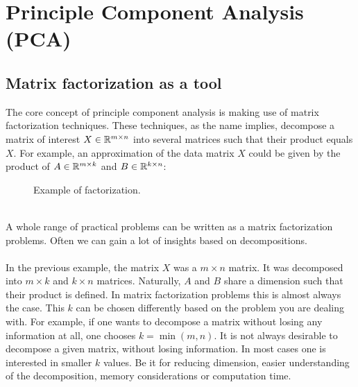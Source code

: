 \renewcommand{\this}{PCA}

\chapter{Principle Component Analysis (PCA)}
	\section{Matrix factorization as a tool}
		The core concept of principle component analysis is making use of matrix factorization techniques. These techniques, as the name implies, decompose a matrix of interest $X \in \mathbb{R}^{m \times n}$ into several matrices such that their product equals $X$. For example, an approximation of the data matrix $X$ could be given by the product of $A \in \mathbb{R}^{m \times k}$ and $B \in \mathbb{R}^{k \times n}$:\\
		\begin{figure}[h!]
			\centering	
			\label{approx}
			\caption{Example of factorization.}
		\end{figure}\\
		A whole range of practical problems can be written as a matrix factorization problems. Often we can gain a lot of insights based on decompositions.
\\\\
In the previous example, the matrix $X$ was a $m \times n$ matrix. It was decomposed into $m \times k$ and $k \times n$ matrices. Naturally, $A$ and $B$ share a dimension such that their product is defined. In matrix factorization problems this is almost always the case. This $k$ can be chosen differently based on the problem you are dealing with. For example, if one wants to decompose a matrix without losing any information at all, one chooses $k = \min(m, n)$. It is not always desirable to decompose a given matrix, without losing information. In most cases one is interested in smaller $k$ values. Be it for reducing dimension, easier understanding of the decomposition, memory considerations or computation time.
\\\\

